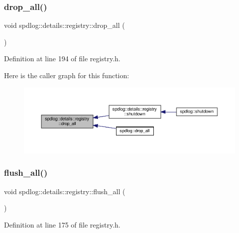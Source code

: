 \subsubsection{\texorpdfstring{drop\+\_\+all()}{drop\_all()}}
{\footnotesize\ttfamily void spdlog\+::details\+::registry\+::drop\+\_\+all (\begin{DoxyParamCaption}{ }\end{DoxyParamCaption})\hspace{0.3cm}{\ttfamily [inline]}}



Definition at line 194 of file registry.\+h.

Here is the caller graph for this function\+:
\nopagebreak
\begin{figure}[H]
\begin{center}
\leavevmode
\includegraphics[width=350pt]{classspdlog_1_1details_1_1registry_a127ccc3786f6ddef57f16d354ba4db91_icgraph}
\end{center}
\end{figure}
\mbox{\label{classspdlog_1_1details_1_1registry_a3abe5826eebb056d51dd0dd75beed42d}} 
\subsubsection{\texorpdfstring{flush\+\_\+all()}{flush\_all()}}
{\footnotesize\ttfamily void spdlog\+::details\+::registry\+::flush\+\_\+all (\begin{DoxyParamCaption}{ }\end{DoxyParamCaption})\hspace{0.3cm}{\ttfamily [inline]}}



Definition at line 175 of file registry.\+h.

